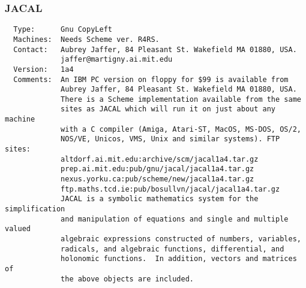 \documentclass[twoside,11pt]{article}
\begin{document}
\subsubsection{JACAL}
\begin{verbatim}
  Type:      Gnu CopyLeft
  Machines:  Needs Scheme ver. R4RS.
  Contact:   Aubrey Jaffer, 84 Pleasant St. Wakefield MA 01880, USA.
             jaffer@martigny.ai.mit.edu
  Version:   1a4
  Comments:  An IBM PC version on floppy for $99 is available from
             Aubrey Jaffer, 84 Pleasant St. Wakefield MA 01880, USA.
             There is a Scheme implementation available from the same
             sites as JACAL which will run it on just about any machine
             with a C compiler (Amiga, Atari-ST, MacOS, MS-DOS, OS/2,
             NOS/VE, Unicos, VMS, Unix and similar systems). FTP sites:
             altdorf.ai.mit.edu:archive/scm/jacal1a4.tar.gz
             prep.ai.mit.edu:pub/gnu/jacal/jacal1a4.tar.gz
             nexus.yorku.ca:pub/scheme/new/jacal1a4.tar.gz
             ftp.maths.tcd.ie:pub/bosullvn/jacal/jacal1a4.tar.gz
             JACAL is a symbolic mathematics system for the simplification
             and manipulation of equations and single and multiple valued
             algebraic expressions constructed of numbers, variables,
             radicals, and algebraic functions, differential, and
             holonomic functions.  In addition, vectors and matrices of
             the above objects are included.
\end{verbatim}
\end{document}
